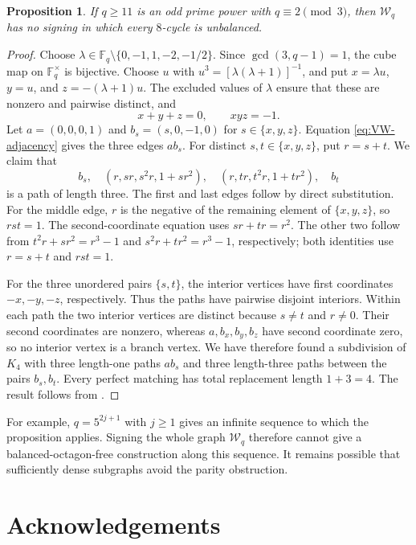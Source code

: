 \documentclass{article}
\newcommand{\FF}{\mathbb{F}}
\newtheorem{proposition}[theorem]{Proposition}
\theoremstyle{definition}
\theoremstyle{remark}
\begin{document}
\begin{proposition}\label{prop:VW-octagon-obstruction}
If $q\geq11$ is an odd prime power with $q\equiv2\pmod3$, then
$\mathcal W_q$ has no signing in which every $8$-cycle is unbalanced.
\end{proposition}
\begin{proof}
Choose $\lambda\in\FF_q\setminus\{0,-1,1,-2,-1/2\}$.  Since
$\gcd(3,q-1)=1$, the cube map on $\FF_q^\times$ is bijective.  Choose
$u$ with $u^3=[\lambda(\lambda+1)]^{-1}$, and put
$x=\lambda u$, $y=u$, and $z=-(\lambda+1)u$.  The excluded values of
$\lambda$ ensure that these are nonzero and pairwise distinct, and
\[
x+y+z=0,\qquad xyz=-1.
\]
Let $a=(0,0,0,1)$ and $b_s=(s,0,-1,0)$ for $s\in\{x,y,z\}$.
Equation \eqref{eq:VW-adjacency} gives the three edges $ab_s$.
For distinct $s,t\in\{x,y,z\}$, put $r=s+t$.  We claim that
\[
b_s,\quad (r,sr,s^2r,1+sr^2),\quad
(r,tr,t^2r,1+tr^2),\quad b_t
\]
is a path of length three.  The first and last edges follow by direct
substitution.  For the middle edge, $r$ is the negative of the remaining
element of $\{x,y,z\}$, so $rst=1$.  The second-coordinate equation uses
$sr+tr=r^2$.  The other two follow from
$t^2r+sr^2=r^3-1$ and $s^2r+tr^2=r^3-1$, respectively; both identities
use $r=s+t$ and $rst=1$.

For the three unordered pairs $\{s,t\}$, the interior vertices have
first coordinates $-x,-y,-z$, respectively.  Thus the paths have
pairwise disjoint interiors.  Within each path the two interior vertices
are distinct because $s\ne t$ and $r\ne0$.  Their second coordinates
are nonzero, whereas $a,b_x,b_y,b_z$ have second coordinate zero, so no
interior vertex is a branch vertex.  We have therefore found a subdivision
of $K_4$ with three length-one paths $ab_s$ and three length-three paths
between the pairs $b_s,b_t$.  Every perfect matching has total replacement
length $1+3=4$.  The result follows from
.
\end{proof}

For example, $q=5^{2j+1}$ with $j\geq1$ gives an infinite sequence to
which the proposition applies.  Signing the whole graph $\mathcal W_q$
therefore cannot give a balanced-octagon-free construction along this
sequence.  It remains possible that sufficiently dense subgraphs avoid
the parity obstruction.

\section*{Acknowledgements}
\end{document}
